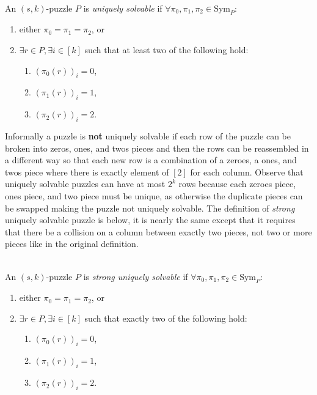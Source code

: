 \documentclass[11pt]{article}
\newcommand\Sym[1]{\ensuremath{\mathrm{Sym}_{#1}}}
\begin{document}
\begin{definition}
  ~\\An $(s,k)$-puzzle $P$ is \emph{uniquely solvable} if
  $\forall \pi_0, \pi_1, \pi_2 \in \Sym{P}:$
  \begin{enumerate}
  \item either $\pi_0 = \pi_1 = \pi_2$, or
  \item $\exists r \in P, \exists i \in [k]$ such that at least two
    of the following hold:
    \begin{enumerate}
    \item $(\pi_0(r))_i = 0$,
    \item $(\pi_1(r))_i = 1$,
    \item $(\pi_2(r))_i = 2$.
    \end{enumerate}
  \end{enumerate}
\end{definition}

Informally a puzzle is \textbf{not} uniquely solvable if each row of
the puzzle can be broken into zeros, ones, and twos pieces and then
the rows can be reassembled in a different way so that each new row is
a combination of a zeroes, a ones, and twos piece where there is
exactly element of $[2]$ for each column.  Observe that uniquely
solvable puzzles can have at most $2^k$ rows because each zeroes
piece, ones piece, and two piece must be unique, as otherwise the
duplicate pieces can be swapped making the puzzle not uniquely
solvable.  The definition of \emph{strong} uniquely solvable puzzle is
below, it is nearly the same except that it requires that there be a
collision on a column between exactly two pieces, not two or more
pieces like in the original definition.

\begin{definition}
  ~\\
  An $(s,k)$-puzzle $P$ is \emph{strong uniquely solvable} if
  $\forall \pi_0, \pi_1, \pi_2 \in \Sym{P}:$
  \begin{enumerate}
  \item either $\pi_0 = \pi_1 = \pi_2$, or
  \item $\exists r \in P, \exists i \in [k]$ such that exactly two
    of the following hold:
    \begin{enumerate}
    \item $(\pi_0(r))_i = 0$,
    \item $(\pi_1(r))_i = 1$,
    \item $(\pi_2(r))_i = 2$.
    \end{enumerate}
  \end{enumerate}
  
\end{definition}
\end{document}
